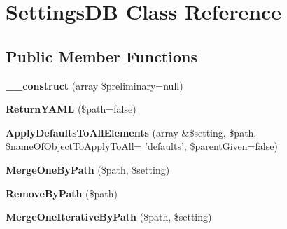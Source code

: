 \hypertarget{class_hypo_conf_1_1_config_scopes_1_1_settings_d_b}{
\section{\-Settings\-D\-B \-Class \-Reference}
\label{class_hypo_conf_1_1_config_scopes_1_1_settings_d_b}
}
\subsection*{\-Public \-Member \-Functions}
\begin{DoxyCompactItemize}
\item 
\hypertarget{class_hypo_conf_1_1_config_scopes_1_1_settings_d_b_a18f9b750f0a1fb1761acc2f7270ef132}{
{\bfseries \-\_\-\-\_\-construct} (array \$preliminary=null)}
\label{class_hypo_conf_1_1_config_scopes_1_1_settings_d_b_a18f9b750f0a1fb1761acc2f7270ef132}

\item 
\hypertarget{class_hypo_conf_1_1_config_scopes_1_1_settings_d_b_a5ab4c44d6595dd1869afcabdac452e3c}{
{\bfseries \-Return\-Y\-A\-M\-L} (\$path=false)}
\label{class_hypo_conf_1_1_config_scopes_1_1_settings_d_b_a5ab4c44d6595dd1869afcabdac452e3c}

\item 
\hypertarget{class_hypo_conf_1_1_config_scopes_1_1_settings_d_b_a23690e017ac6e79a86f1ea29e6574ebe}{
{\bfseries \-Apply\-Defaults\-To\-All\-Elements} (array \&\$setting, \$path, \$name\-Of\-Object\-To\-Apply\-To\-All= 'defaults', \$parent\-Given=false)}
\label{class_hypo_conf_1_1_config_scopes_1_1_settings_d_b_a23690e017ac6e79a86f1ea29e6574ebe}

\item 
\hypertarget{class_hypo_conf_1_1_config_scopes_1_1_settings_d_b_ae28b77a588fb42d36ba0c02c3f3a55bf}{
{\bfseries \-Merge\-One\-By\-Path} (\$path, \$setting)}
\label{class_hypo_conf_1_1_config_scopes_1_1_settings_d_b_ae28b77a588fb42d36ba0c02c3f3a55bf}

\item 
\hypertarget{class_hypo_conf_1_1_config_scopes_1_1_settings_d_b_a5686aa374fab8bc50eb3c8dc2b844b34}{
{\bfseries \-Remove\-By\-Path} (\$path)}
\label{class_hypo_conf_1_1_config_scopes_1_1_settings_d_b_a5686aa374fab8bc50eb3c8dc2b844b34}

\item 
\hypertarget{class_hypo_conf_1_1_config_scopes_1_1_settings_d_b_a7f88da131f6d8e74e66ab95791a217e9}{
{\bfseries \-Merge\-One\-Iterative\-By\-Path} (\$path, \$setting)}
\label{class_hypo_conf_1_1_config_scopes_1_1_settings_d_b_a7f88da131f6d8e74e66ab95791a217e9}


\end{DoxyCompactItemize}
